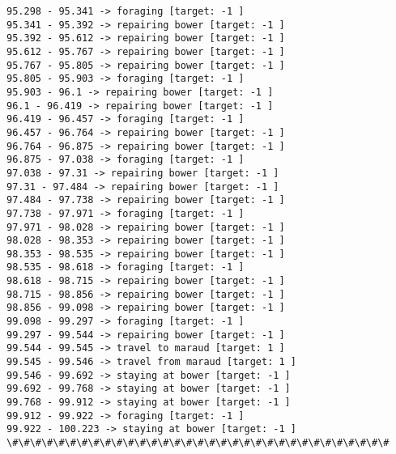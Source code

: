\documentclass[11pt]{article}
\begin{document}
\begin{Verbatim}[commandchars=\\\{\}]
95.298 - 95.341 -> foraging [target: -1 ]
95.341 - 95.392 -> repairing bower [target: -1 ]
95.392 - 95.612 -> repairing bower [target: -1 ]
95.612 - 95.767 -> repairing bower [target: -1 ]
95.767 - 95.805 -> repairing bower [target: -1 ]
95.805 - 95.903 -> foraging [target: -1 ]
95.903 - 96.1 -> repairing bower [target: -1 ]
96.1 - 96.419 -> repairing bower [target: -1 ]
96.419 - 96.457 -> foraging [target: -1 ]
96.457 - 96.764 -> repairing bower [target: -1 ]
96.764 - 96.875 -> repairing bower [target: -1 ]
96.875 - 97.038 -> foraging [target: -1 ]
97.038 - 97.31 -> repairing bower [target: -1 ]
97.31 - 97.484 -> repairing bower [target: -1 ]
97.484 - 97.738 -> repairing bower [target: -1 ]
97.738 - 97.971 -> foraging [target: -1 ]
97.971 - 98.028 -> repairing bower [target: -1 ]
98.028 - 98.353 -> repairing bower [target: -1 ]
98.353 - 98.535 -> repairing bower [target: -1 ]
98.535 - 98.618 -> foraging [target: -1 ]
98.618 - 98.715 -> repairing bower [target: -1 ]
98.715 - 98.856 -> repairing bower [target: -1 ]
98.856 - 99.098 -> repairing bower [target: -1 ]
99.098 - 99.297 -> foraging [target: -1 ]
99.297 - 99.544 -> repairing bower [target: -1 ]
99.544 - 99.545 -> travel to maraud [target: 1 ]
99.545 - 99.546 -> travel from maraud [target: 1 ]
99.546 - 99.692 -> staying at bower [target: -1 ]
99.692 - 99.768 -> staying at bower [target: -1 ]
99.768 - 99.912 -> staying at bower [target: -1 ]
99.912 - 99.922 -> foraging [target: -1 ]
99.922 - 100.223 -> staying at bower [target: -1 ]
\#\#\#\#\#\#\#\#\#\#\#\#\#\#\#\#\#\#\#\#\#\#\#\#\#\#\#\#\#\#\#\#\#



\end{Verbatim}
\end{document}

